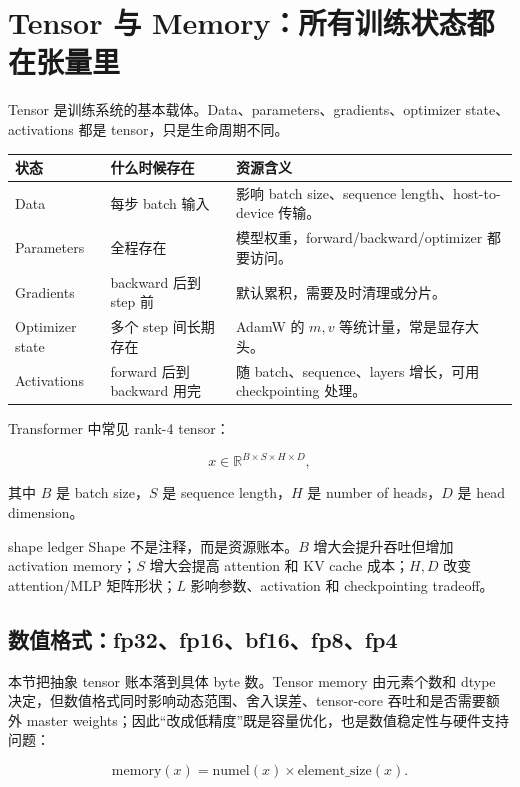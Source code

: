 \section{Tensor 与 Memory：所有训练状态都在张量里}

Tensor 是训练系统的基本载体。Data、parameters、gradients、optimizer state、activations 都是 tensor，只是生命周期不同。

\begin{longtable}{p{}p{}p{}}
\toprule
\textbf{状态} & \textbf{什么时候存在} & \textbf{资源含义} \\
\midrule
Data & 每步 batch 输入 & 影响 batch size、sequence length、host-to-device 传输。 \\
Parameters & 全程存在 & 模型权重，forward/backward/optimizer 都要访问。 \\
Gradients & backward 后到 step 前 & 默认累积，需要及时清理或分片。 \\
Optimizer state & 多个 step 间长期存在 & AdamW 的 \(m,v\) 等统计量，常是显存大头。 \\
Activations & forward 后到 backward 用完 & 随 batch、sequence、layers 增长，可用 checkpointing 处理。 \\
\bottomrule
\end{longtable}

Transformer 中常见 rank-4 tensor：

\[
x\in\mathbb{R}^{B\times S\times H\times D},
\]

其中 \(B\) 是 batch size，\(S\) 是 sequence length，\(H\) 是 number of heads，\(D\) 是 head dimension。

\begin{knowledgebox}{shape ledger}
Shape 不是注释，而是资源账本。\(B\) 增大会提升吞吐但增加 activation memory；\(S\) 增大会提高 attention 和 KV cache 成本；\(H,D\) 改变 attention/MLP 矩阵形状；\(L\) 影响参数、activation 和 checkpointing tradeoff。
\end{knowledgebox}

\subsection{数值格式：fp32、fp16、bf16、fp8、fp4}

本节把抽象 tensor 账本落到具体 byte 数。Tensor memory 由元素个数和 dtype 决定，但数值格式同时影响动态范围、舍入误差、tensor-core 吞吐和是否需要额外 master weights；因此“改成低精度”既是容量优化，也是数值稳定性与硬件支持问题：

\[
\text{memory}(x)=\text{numel}(x)\times \text{element\_size}(x).
\]


